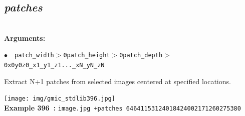 \documentclass[a4paper,10.5pt,twoside]{book}
\def\comma{\discretionary{,}{}{,}}
\newcommand{\Cb}[1]{\textcolor{cb}{#1}}
\begin{document}
\subsection{\emph{patches} }\vspace*{-0.7em}
~\\\textbf{\Cb{Arguments: }}\begin{flushleft}
{\small \Cb{\hspace*{0.5cm}$\bullet$~~\texttt{patch\_width$>$0{\comma}patch\_height$>$0{\comma}patch\_depth$>$0{\comma}x0{\comma}y0{\comma}z0{\comma}\_x1{\comma}\_y1{\comma}\-\_z1{\comma}...{\comma}\_xN{\comma}\_yN{\comma}\_zN}}}\end{flushleft}
Extract N+1 patches from selected images{\comma} centered at specified locations.
\begin{center}\texttt{[image: img/gmic\_stdlib396.jpg]}\\
{\footnotesize \textbf{Example 396~:} \texttt{image.jpg +patches 64{\comma}64{\comma}1{\comma}153{\comma}124{\comma}0{\comma}184{\comma}240{\comma}0{\comma}217{\comma}126{\comma}0{\comma}275{\comma}38{\comma}0}}
\end{center}
\end{document}
